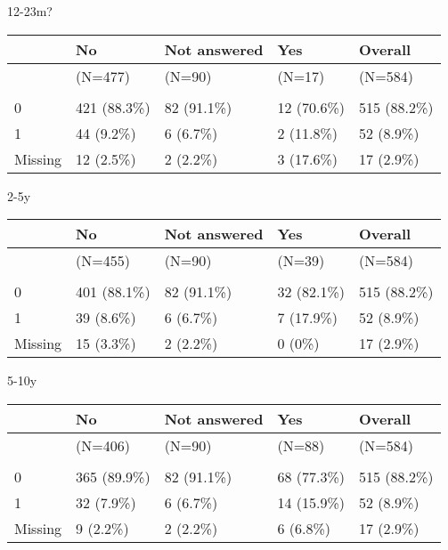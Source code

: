\documentclass[
]{article}
\begin{document}
12-23m?

\begin{tabular}[t]{lllll}
\toprule
  & No & Not answered & Yes & Overall\\
\midrule
 & (N=477) & (N=90) & (N=17) & (N=584)\\
\addlinespace[0.3em]
\multicolumn{5}{l}{\textbf{piab\_pos}}\\
\hspace{1em}0 & 421 (88.3\%) & 82 (91.1\%) & 12 (70.6\%) & 515 (88.2\%)\\
\hspace{1em}1 & 44 (9.2\%) & 6 (6.7\%) & 2 (11.8\%) & 52 (8.9\%)\\
\hspace{1em}Missing & 12 (2.5\%) & 2 (2.2\%) & 3 (17.6\%) & 17 (2.9\%)\\
\bottomrule
\end{tabular}

2-5y

\begin{tabular}[t]{lllll}
\toprule
  & No & Not answered & Yes & Overall\\
\midrule
 & (N=455) & (N=90) & (N=39) & (N=584)\\
\addlinespace[0.3em]
\multicolumn{5}{l}{\textbf{piab\_pos}}\\
\hspace{1em}0 & 401 (88.1\%) & 82 (91.1\%) & 32 (82.1\%) & 515 (88.2\%)\\
\hspace{1em}1 & 39 (8.6\%) & 6 (6.7\%) & 7 (17.9\%) & 52 (8.9\%)\\
\hspace{1em}Missing & 15 (3.3\%) & 2 (2.2\%) & 0 (0\%) & 17 (2.9\%)\\
\bottomrule
\end{tabular}

5-10y

\begin{tabular}[t]{lllll}
\toprule
  & No & Not answered & Yes & Overall\\
\midrule
 & (N=406) & (N=90) & (N=88) & (N=584)\\
\addlinespace[0.3em]
\multicolumn{5}{l}{\textbf{piab\_pos}}\\
\hspace{1em}0 & 365 (89.9\%) & 82 (91.1\%) & 68 (77.3\%) & 515 (88.2\%)\\
\hspace{1em}1 & 32 (7.9\%) & 6 (6.7\%) & 14 (15.9\%) & 52 (8.9\%)\\
\hspace{1em}Missing & 9 (2.2\%) & 2 (2.2\%) & 6 (6.8\%) & 17 (2.9\%)\\
\bottomrule
\end{tabular}
\end{document}
